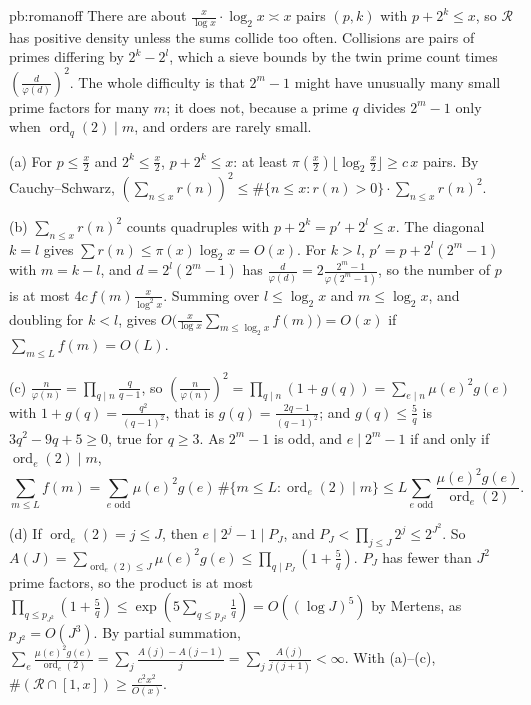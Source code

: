 \begin{solution}{pb:romanoff}
\idea There are about $\frac x{\log x}\cdot\log_2x\asymp x$ pairs $(p,k)$ with $p+2^k\le x$, so $\mathcal R$ has positive density unless the sums collide too often. Collisions are pairs of
primes differing by $2^k-2^l$, which a sieve bounds by the twin prime count times $(\frac d{\varphi(d)})^2$. The whole difficulty is that $2^m-1$ might have unusually many small prime
factors for many $m$; it does not, because a prime $q$ divides $2^m-1$ only when $\operatorname{ord}_q(2)\mid m$, and orders are rarely small.

\writeup (a) For $p\le\frac x2$ and $2^k\le\frac x2$, $p+2^k\le x$: at least $\pi(\frac x2)\lfloor\log_2\frac x2\rfloor\ge c\,x$ pairs. By Cauchy--Schwarz,
$(\sum_{n\le x}r(n))^2\le\#\{n\le x:r(n)>0\}\cdot\sum_{n\le x}r(n)^2$.

(b) $\sum_{n\le x}r(n)^2$ counts quadruples with $p+2^k=p'+2^l\le x$. The diagonal $k=l$ gives $\sum r(n)\le\pi(x)\log_2x=O(x)$. For $k>l$, $p'=p+2^l(2^m-1)$ with $m=k-l$, and
$d=2^l(2^m-1)$ has $\frac d{\varphi(d)}=2\frac{2^m-1}{\varphi(2^m-1)}$, so the number of $p$ is at most $4c\,f(m)\frac x{\log^2x}$. Summing over $l\le\log_2x$ and $m\le\log_2x$, and
doubling for $k<l$, gives $O\bigl(\frac x{\log x}\sum_{m\le\log_2x}f(m)\bigr)=O(x)$ if $\sum_{m\le L}f(m)=O(L)$.

(c) $\frac n{\varphi(n)}=\prod_{q\mid n}\frac q{q-1}$, so $(\frac n{\varphi(n)})^2=\prod_{q\mid n}(1+g(q))=\sum_{e\mid n}\mu(e)^2g(e)$ with $1+g(q)=\frac{q^2}{(q-1)^2}$, that is
$g(q)=\frac{2q-1}{(q-1)^2}$; and $g(q)\le\frac5q$ is $3q^2-9q+5\ge0$, true for $q\ge3$. As $2^m-1$ is odd, and $e\mid2^m-1$ if and only if $\operatorname{ord}_e(2)\mid m$,
\[
\sum_{m\le L}f(m)=\sum_{e\text{ odd}}\mu(e)^2g(e)\,\#\{m\le L:\operatorname{ord}_e(2)\mid m\}\le L\sum_{e\text{ odd}}\frac{\mu(e)^2g(e)}{\operatorname{ord}_e(2)}.
\]

(d) If $\operatorname{ord}_e(2)=j\le J$, then $e\mid2^j-1\mid P_J$, and $P_J<\prod_{j\le J}2^j\le2^{J^2}$. So $A(J)=\sum_{\operatorname{ord}_e(2)\le J}\mu(e)^2g(e)\le\prod_{q\mid P_J}(1+\frac5q)$. $P_J$ has
fewer than $J^2$ prime factors, so the product is at most $\prod_{q\le p_{J^2}}(1+\frac5q)\le\exp(5\sum_{q\le p_{J^2}}\frac1q)=O((\log J)^5)$ by Mertens, as $p_{J^2}=O(J^3)$. By partial summation,
$\sum_e\frac{\mu(e)^2g(e)}{\operatorname{ord}_e(2)}=\sum_j\frac{A(j)-A(j-1)}j=\sum_j\frac{A(j)}{j(j+1)}<\infty$. With (a)--(c), $\#(\mathcal R\cap[1,x])\ge\frac{c^2x^2}{O(x)}$.


\end{solution}
